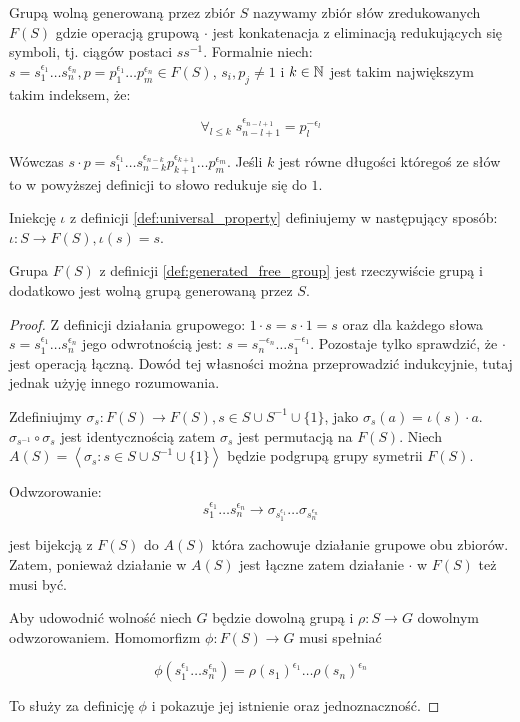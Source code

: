 \begin{defin}
  Grupą wolną generowaną przez zbiór $S$ nazywamy zbiór słów zredukowanych
  $F(S)$ gdzie operacją grupową $\cdot$ jest konkatenacja z eliminacją
  redukujących się symboli, tj. ciągów postaci $ss^{-1}$. Formalnie niech:
  $s = s_1^{\epsilon_1}\ldots s_n^{\epsilon_n}, p = p_1^{\epsilon_1}\ldots
  p_m^{\epsilon_n} \in F(S)$, $s_i, p_j \neq 1$ i $k \in \mathbb{N}$ jest takim
  największym takim indeksem, że:

  \[\forall_{l \leq k} \; s_{n - l + 1}^{\epsilon_{n - l + 1}} =
    p_l^{-\epsilon_l}\]

  Wówczas $s \cdot p = s_1^{\epsilon_1}\ldots s_{n -
  k}^{\epsilon_{n-k}}p_{k+1}^{\epsilon_{k+1}}\ldots p_{m}^{\epsilon_m}$. Jeśli
  $k$ jest równe długości któregoś ze słów to w powyższej definicji to słowo
  redukuje się do $1$.

  Iniekcję $\iota$ z definicji \ref{def:universal_property} definiujemy w
  następujący sposób: $\iota: S \rightarrow F(S), \iota(s) = s$.
  \label{def:generated_free_group}
\end{defin}

\begin{theorem}
  Grupa $F(S)$ z definicji \ref{def:generated_free_group} jest rzeczywiście grupą
  i dodatkowo jest wolną grupą generowaną przez $S$.
\end{theorem}
\begin{proof}
  Z definicji działania grupowego: $1 \cdot s = s \cdot 1 = s$ oraz
  dla każdego słowa
  $s = s_1^{\epsilon_1}\ldots s_n^{\epsilon_n}$
  jego odwrotnością jest:
  $s = s_n^{-\epsilon_n}\ldots s_1^{-\epsilon_1}$. Pozostaje tylko sprawdzić, że
  $\cdot$ jest operacją łączną. Dowód tej własności można przeprowadzić
  indukcyjnie, tutaj jednak użyję innego rozumowania.

  Zdefiniujmy $\sigma_s: F(S) \rightarrow F(S), s \in S \cup S^{-1} \cup \{1\}$,
  jako $\sigma_s(a) = \iota(s) \cdot a$. $\sigma_{s^{-1}} \circ \sigma_{s}$ jest
  identycznością zatem $\sigma_{s}$ jest permutacją na $F(S)$. Niech
  $A(S) = \left\langle \sigma_s : s \in S \cup S^{-1} \cup \{1\}\right\rangle$
  będzie podgrupą grupy symetrii $F(S)$.

  Odwzorowanie:
  \[
    s_1^{\epsilon_1} \ldots
    s_n^{\epsilon_n} \rightarrow
    \sigma_{s_1^{\epsilon_1}} \ldots
    \sigma_{s_n^{\epsilon_n}}
  \]

  jest bijekcją z $F(S)$ do $A(S)$ która zachowuje działanie grupowe obu zbiorów.
  Zatem, ponieważ działanie w $A(S)$ jest łączne zatem działanie $\cdot$ w
  $F(S)$ też musi być.

  Aby udowodnić wolność niech $G$ będzie dowolną grupą i $\rho: S \rightarrow G$
  dowolnym odwzorowaniem. Homomorfizm $\phi: F(S) \rightarrow G$ musi spełniać

  \[ \phi\left(s_1^{\epsilon_1} \ldots s_n^{\epsilon_n}\right) =
  \rho\left(s_1\right)^{\epsilon_1} \ldots \rho\left(s_n\right)^{\epsilon_n}\]

  To służy za definicję $\phi$ i pokazuje jej istnienie oraz jednoznaczność.
\end{proof}

